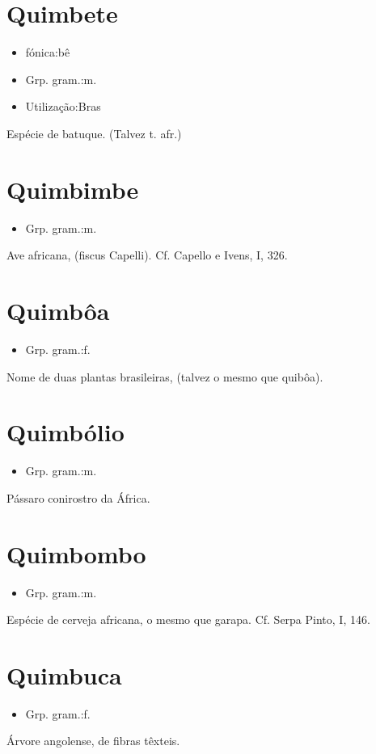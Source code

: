 \section{Quimbete}
\begin{itemize}
\item {fónica:bê}
\end{itemize}
\begin{itemize}
\item {Grp. gram.:m.}
\end{itemize}
\begin{itemize}
\item {Utilização:Bras}
\end{itemize}
Espécie de batuque.
(Talvez t. afr.)
\section{Quimbimbe}
\begin{itemize}
\item {Grp. gram.:m.}
\end{itemize}
Ave africana, (\textunderscore fiscus Capelli\textunderscore ). Cf. Capello e Ivens, I, 326.
\section{Quimbôa}
\begin{itemize}
\item {Grp. gram.:f.}
\end{itemize}
Nome de duas plantas brasileiras, (talvez o mesmo que \textunderscore quibôa\textunderscore ).
\section{Quimbólio}
\begin{itemize}
\item {Grp. gram.:m.}
\end{itemize}
Pássaro conirostro da África.
\section{Quimbombo}
\begin{itemize}
\item {Grp. gram.:m.}
\end{itemize}
Espécie de cerveja africana, o mesmo que \textunderscore garapa\textunderscore . Cf. Serpa Pinto, I, 146.
\section{Quimbuca}
\begin{itemize}
\item {Grp. gram.:f.}
\end{itemize}
Árvore angolense, de fibras têxteis.
